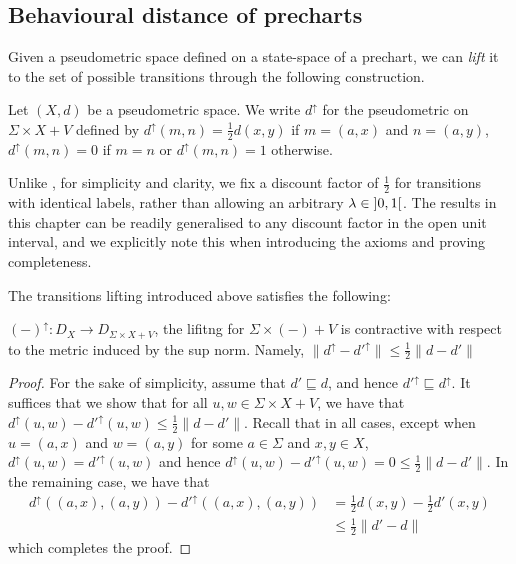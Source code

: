 \subsection{Behavioural distance of precharts}
Given a pseudometric space defined on a state-space of a prechart, we can \emph{lift} it to the set of possible transitions through the following construction.
\begin{definition}\label{def:edge}
	Let $(X,d)$ be a pseudometric space. We write $d^\uparrow$ for the pseudometric on $\Sigma \times X + V$ defined by $d^\uparrow(m, n) = \frac{1}{2} d(x,y)$ if $m = (a,x)$ and $n = (a,y)$, $d^\uparrow(m,n)=0$ if $m = n$ or $d^{\uparrow}(m,n)=1$ otherwise.
\end{definition}
\begin{remark}\label{c3:rem:discount}
	Unlike , for simplicity and clarity, we fix a discount factor of $\frac{1}{2}$ for transitions with identical labels, rather than allowing an arbitrary  $\lambda \in \interval[open]{0}{1}$. The results in this chapter can be readily generalised to any discount factor in the open unit interval, and we explicitly note this when introducing the axioms and proving completeness.
\end{remark}
The transitions lifting introduced above satisfies the following:
\begin{lemma}
	$(-)^\uparrow \colon D_X \to D_{\Sigma \times X + V}$, the lifitng for $\Sigma \times (-) + V$ is contractive with respect to the metric induced by the sup norm. Namely,
	$\|d^\uparrow - d'^\uparrow \| \leq \frac{1}{2} \|d - d' \|$ 
\end{lemma}
\begin{proof}
	For the sake of simplicity, assume that $d' \sqsubseteq d$, and hence $d'^\uparrow \sqsubseteq d^\uparrow$. It suffices that we show that for all $u,w \in \Sigma \times X + V$, we have that $ d^\uparrow(u,w) - d'^\uparrow(u,w) \leq \frac{1}{2}\|d-d'\|$. Recall that in all cases, except when $u=(a,x)$ and $w=(a,y)$ for some $a \in \Sigma$ and $x,y \in X$, $d^\uparrow(u,w)=d'^\uparrow(u,w)$ and hence  $d^\uparrow(u,w)-d'^\uparrow(u,w) = 0 \leq \frac{1}{2} \|d - d'\|$. In the remaining case, we have that
	\begin{align*}
		d^\uparrow((a,x),(a,y)) - d'^\uparrow((a,x),(a,y)) &= \frac{1}{2}d(x,y) - \frac{1}{2}d'(x,y) \\
		&\leq \frac{1}{2} \|d'-d\|
	\end{align*}
	which completes the proof.
\end{proof}
